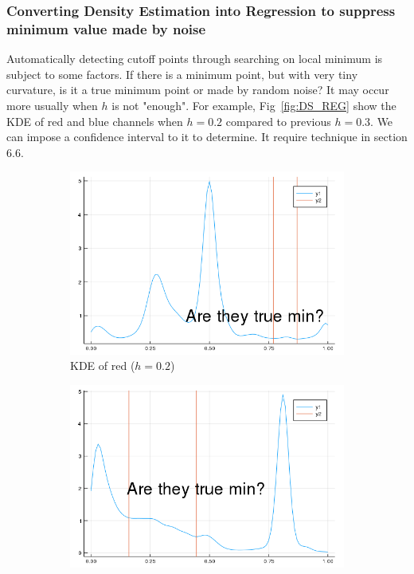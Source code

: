 \documentclass{beamer}
\begin{document}
\begin{frame}
  \frametitle{Converting Density Estimation into Regression to suppress minimum value made by noise}

  Automatically detecting cutoff points through searching on local minimum is subject to some factors. 
If there is a minimum point, but with very tiny curvature, is it a true minimum point or made by random noise? 
It may occur more usually when $h$ is not "enough".
For example, Fig~\ref{fig:DS_REG} show the KDE of red and blue channels when $h=0.2$ compared to previous $h=0.3$.
We can impose a confidence interval to it to determine. 
It require technique in \cite{wasserman2006all} section 6.6.

\begin{figure}[htb]
  \centering
  \begin{subfigure}[b]{0.24\linewidth}
    \includegraphics[width=\linewidth]{images/fake_min_r.png}
    \caption{KDE of red ($h=0.2$)}
  \end{subfigure}
  \begin{subfigure}[b]{0.24\linewidth}
    \includegraphics[width=\linewidth]{images/fake_min_b.png}

\end{subfigure}
\end{figure}
\end{frame}
\end{document}
